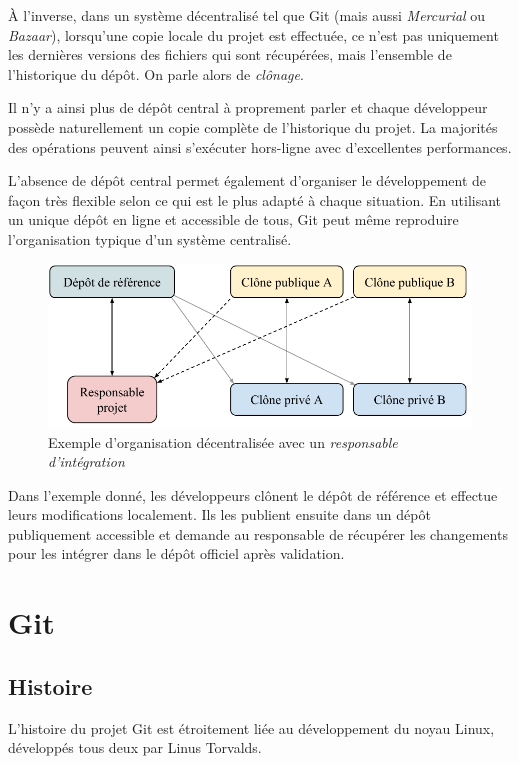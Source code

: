 \documentclass[11pt,a4paper]{article}
\begin{document}
À l'inverse, dans un système décentralisé tel que Git (mais aussi \textit{Mercurial} ou \textit{Bazaar}), lorsqu'une copie locale du projet est effectuée, ce n'est pas uniquement les dernières versions des fichiers qui sont récupérées, mais l'ensemble de l'historique du dépôt.
On parle alors de \textit{clônage}.

Il n'y a ainsi plus de dépôt central à proprement parler et chaque développeur possède naturellement un copie complète de l'historique du projet.
La majorités des opérations peuvent ainsi s'exécuter hors-ligne avec d'excellentes performances.

L'absence de dépôt central permet également d'organiser le développement de façon très flexible selon ce qui est le plus adapté à chaque situation.
En utilisant un unique dépôt en ligne et accessible de tous, Git peut même reproduire l'organisation typique d'un système centralisé.

\begin{figure}[ht]
\begin{center}
\includegraphics[width=11.5cm]{img_dvcs}
\caption{Exemple d'organisation décentralisée avec un \textit{responsable d'intégration}}
\end{center}
\end{figure}

Dans l'exemple donné, les développeurs clônent le dépôt de référence et effectue leurs modifications localement.
Ils les publient ensuite dans un dépôt publiquement accessible et demande au responsable de récupérer les changements pour les intégrer dans le dépôt officiel après validation.

\section{Git}

\subsection{Histoire}

L'histoire du projet Git est étroitement liée au développement du noyau Linux, développés tous deux par Linus Torvalds.
\end{document}
